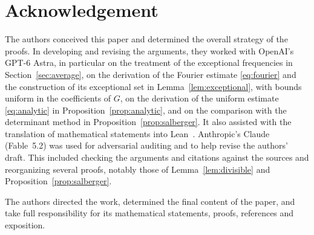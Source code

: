 \documentclass[11pt]{amsart}
\numberwithin{equation}{section}
\numberwithin{figure}{section}
\theoremstyle{definition}
\begin{document}
\section*{Acknowledgement}

The authors conceived this paper and determined the overall strategy
of the proofs. In developing and revising the arguments, they worked
with OpenAI's GPT-6 Astra, in particular on the treatment of the
exceptional frequencies in Section~\ref{sec:average}, on the derivation
of the Fourier estimate \eqref{eq:fourier} and the construction of
its exceptional set in Lemma~\ref{lem:exceptional}, with bounds
uniform in the coefficients of $G$, on the derivation of the uniform
estimate \eqref{eq:analytic} in Proposition~\ref{prop:analytic}, and
on the comparison with the determinant method in
Proposition~\ref{prop:salberger}. It also assisted with the
translation of mathematical statements into Lean~\cite{NRZ}.
Anthropic's Claude (Fable~5.2) was used for adversarial auditing and
to help revise the authors' draft. This included
checking the arguments and citations against the sources and
reorganizing several proofs, notably those of
Lemma~\ref{lem:divisible} and Proposition~\ref{prop:salberger}.

The authors directed the work, determined the final content of the
paper, and take full responsibility for its mathematical statements,
proofs, references and exposition.
\end{document}
